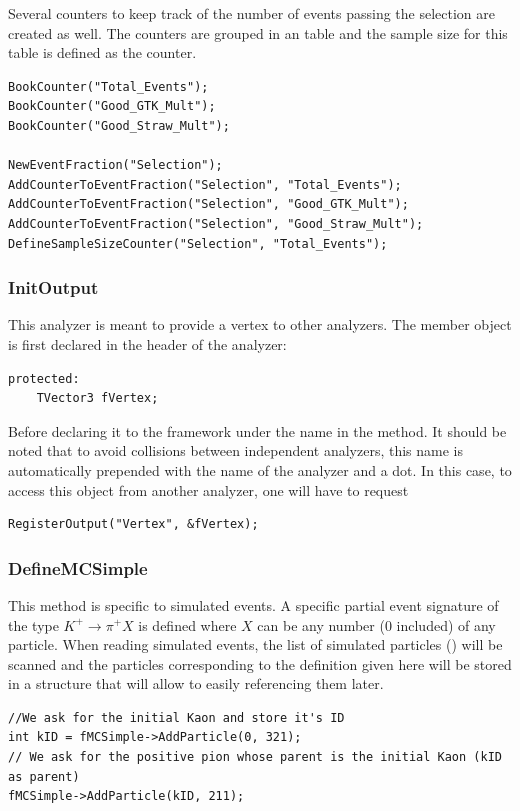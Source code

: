 Several counters to keep track of the number of events passing the selection are created as well.
The counters are grouped in an  table and the sample size for this table is
defined as the  counter.

\begin{lstlisting}
BookCounter("Total_Events");
BookCounter("Good_GTK_Mult");
BookCounter("Good_Straw_Mult");

NewEventFraction("Selection");
AddCounterToEventFraction("Selection", "Total_Events");
AddCounterToEventFraction("Selection", "Good_GTK_Mult");
AddCounterToEventFraction("Selection", "Good_Straw_Mult");
DefineSampleSizeCounter("Selection", "Total_Events");
\end{lstlisting} 

\subsubsection{InitOutput}
This analyzer is meant to provide a vertex to other analyzers. The  member object is
first declared in the header of the analyzer:

\begin{lstlisting}
protected:
	TVector3 fVertex;
\end{lstlisting}
Before declaring it to the framework under the name  in the 
method. It should be noted that to avoid collisions between independent analyzers, this name is
automatically prepended with the name of the analyzer and a dot. In this case, to access this
object from another analyzer, one will have to request 

\begin{lstlisting}
RegisterOutput("Vertex", &fVertex);
\end{lstlisting}

\subsubsection{DefineMCSimple}
This method is specific to simulated events. A specific partial event signature of the type
$K^+\to\pi^+X$ is defined where $X$ can be any number (0 included) of any particle. When reading
simulated events, the list of simulated particles () will be scanned and the
particles corresponding to the definition given here will be stored in a structure that will allow
to easily referencing them later.

\begin{lstlisting}
//We ask for the initial Kaon and store it's ID
int kID = fMCSimple->AddParticle(0, 321);
// We ask for the positive pion whose parent is the initial Kaon (kID as parent)
fMCSimple->AddParticle(kID, 211);
\end{lstlisting}

